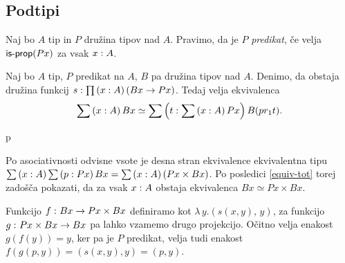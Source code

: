 \subsection{Podtipi}

\begin{definicija}
  Naj bo \(A\) tip in \(P\) družina tipov nad \(A\). Pravimo, da je \(P\) \emph{predikat},
  če velja \(\textnormal{\textsf{is-prop}}(Px)\) za vsak \(x : A\).
\end{definicija}

\begin{trditev}
  \label{full-subtype}
  Naj bo \(A\) tip, \(P\) predikat na \(A\), \(B\) pa družina tipov nad \(A\). Denimo, da
  obstaja družina funkcij \(s : \prod \left( x : A \right) (Bx \to Px)\).
  Tedaj velja ekvivalenca
  \[\sum \left( x : A \right) Bx \simeq \sum \left( t : \sum \left( x : A \right) Px \right) B (pr_{1} t).\]
\end{trditev}
p
\begin{dokaz}
  Po asociativnosti odvisne vsote je desna stran ekvivalence ekvivalentna tipu
  \(\sum \left( x : A \right) \sum \left( p : Px \right) Bx = \sum \left( x : A \right) (Px \times Bx)\).
  Po posledici \ref{equiv-tot} torej zadošča pokazati, da za vsak \(x : A\)
  obstaja ekvivalenca \(Bx \simeq Px \times Bx\).

  Funkcijo \(f \,\colon Bx \to Px \times Bx\) definiramo kot
  \(\lambda \, y. \left(s(x,y),\, y\right)\), za funkcijo \(g \,\colon Px \times Bx \to Bx\) pa
  lahko vzamemo drugo projekcijo. Očitno velja enakost \(g(f(y)) = y\), ker pa je \(P\)
  predikat, velja tudi enakost
  \(f(g\left(p, y\right)) = \left(s(x, y), y\right) = \left(p, y\right)\).

\end{dokaz}

